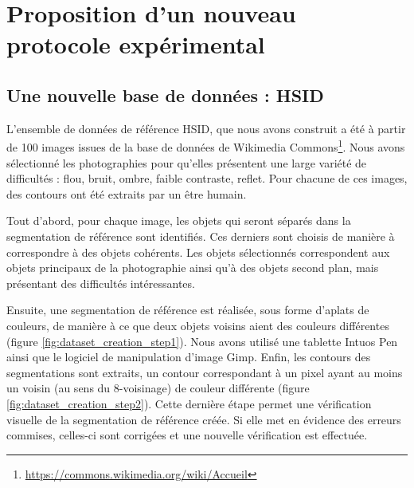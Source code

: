 \section{Proposition d'un nouveau protocole expérimental}
\label{sec:HSID-description-protocole-evaluation}
\subsection{Une nouvelle base de données : HSID}
L'ensemble de données de référence HSID, que   nous avons construit\modif{,} a été  à partir de 100 images issues de la base de données de Wikimedia Commons\footnote{\url{https://commons.wikimedia.org/wiki/Accueil}}. Nous avons sélectionné les photographies pour qu'elles présentent une large variété de difficultés : flou, bruit, ombre, faible contraste, reflet. Pour chacune de ces images, des contours ont été extraits par un être humain. 

Tout d'abord, pour chaque image, les objets qui seront séparés dans la segmentation de référence sont identifiés. Ces derniers sont choisis de manière à correspondre à des objets cohérents. Les objets sélectionnés correspondent aux objets principaux de la photographie ainsi qu'à des objets  second plan, mais présentant des difficultés intéressantes.

Ensuite, une segmentation de référence est réalisée, sous forme d’aplats de couleurs, de manière à ce que deux objets voisins aient des couleurs différentes (figure \ref{fig:dataset_creation_step1}). Nous avons utilisé une tablette Intuos Pen ainsi que le logiciel de manipulation d'image Gimp. Enfin, les contours des segmentations sont extraits, un contour correspondant à un pixel ayant au moins un voisin (au sens du 8-voisinage)  de couleur différente (figure \ref{fig:dataset_creation_step2}). Cette dernière étape permet une vérification visuelle de la segmentation de référence créée. Si elle met en évidence des erreurs commises, celles-ci sont corrigées et une nouvelle vérification est effectuée.

